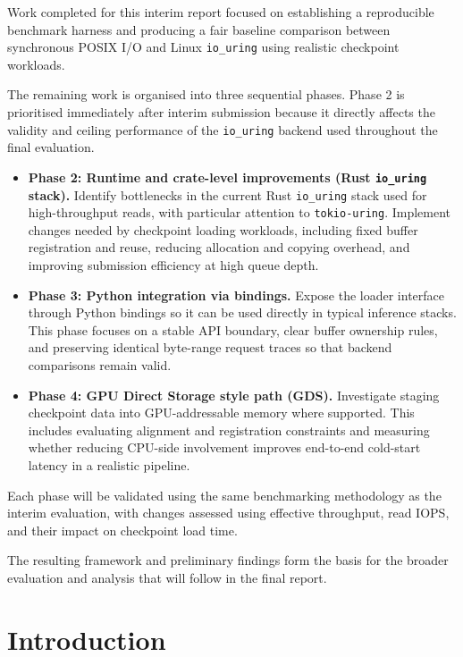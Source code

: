 \documentclass[]{final_report}
\begin{document}
Work completed for this interim report focused on establishing a reproducible benchmark harness and producing a fair baseline comparison between synchronous POSIX I/O and Linux \texttt{io\_uring} using realistic checkpoint workloads.

The remaining work is organised into three sequential phases. Phase 2 is prioritised immediately after interim submission because it directly affects the validity and ceiling performance of the \texttt{io\_uring} backend used throughout the final evaluation.

\begin{itemize}
    \item \textbf{Phase 2: Runtime and crate-level improvements (Rust \texttt{io\_uring} stack).}
    Identify bottlenecks in the current Rust \texttt{io\_uring} stack used for high-throughput reads, with particular attention to \texttt{tokio-uring}. Implement changes needed by checkpoint loading workloads, including fixed buffer registration and reuse, reducing allocation and copying overhead, and improving submission efficiency at high queue depth.

    \item \textbf{Phase 3: Python integration via bindings.}
    Expose the loader interface through Python bindings so it can be used directly in typical inference stacks. This phase focuses on a stable API boundary, clear buffer ownership rules, and preserving identical byte-range request traces so that backend comparisons remain valid.

    \item \textbf{Phase 4: GPU Direct Storage style path (GDS).}
    Investigate staging checkpoint data into GPU-addressable memory where supported. This includes evaluating alignment and registration constraints and measuring whether reducing CPU-side involvement improves end-to-end cold-start latency in a realistic pipeline.
\end{itemize}

Each phase will be validated using the same benchmarking methodology as the interim evaluation, with changes assessed using effective throughput, read IOPS, and their impact on checkpoint load time.


The resulting framework and preliminary findings form the basis for the broader evaluation and analysis that will follow in the final report.
\newpage



\chapter{Introduction}
\label{chap:introduction}
\end{document}
